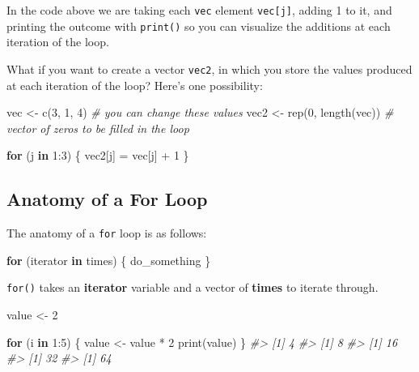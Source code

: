 \documentclass[
]{book}
\newenvironment{Shaded}{\begin{snugshade}}{\end{snugshade}}
\newcommand{\CommentTok}[1]{\textcolor[rgb]{0.56,0.35,0.01}{\textit{#1}}}
\newcommand{\ControlFlowTok}[1]{\textcolor[rgb]{0.13,0.29,0.53}{\textbf{#1}}}
\newcommand{\DecValTok}[1]{\textcolor[rgb]{0.00,0.00,0.81}{#1}}
\newcommand{\FunctionTok}[1]{\textcolor[rgb]{0.00,0.00,0.00}{#1}}
\newcommand{\NormalTok}[1]{#1}
\newcommand{\OtherTok}[1]{\textcolor[rgb]{0.56,0.35,0.01}{#1}}
\newcommand{\SpecialCharTok}[1]{\textcolor[rgb]{0.00,0.00,0.00}{#1}}
\begin{document}
In the code above we are taking each \texttt{vec} element \texttt{vec{[}j{]}}, adding 1 to it,
and printing the outcome with \texttt{print()} so you can visualize the additions
at each iteration of the loop.

What if you want to create a vector \texttt{vec2}, in which you store the values
produced at each iteration of the loop? Here's one possibility:

\begin{Shaded}
\begin{Highlighting}[]
\NormalTok{vec }\OtherTok{\textless{}{-}} \FunctionTok{c}\NormalTok{(}\DecValTok{3}\NormalTok{, }\DecValTok{1}\NormalTok{, }\DecValTok{4}\NormalTok{)  }\CommentTok{\# you can change these values}
\NormalTok{vec2 }\OtherTok{\textless{}{-}} \FunctionTok{rep}\NormalTok{(}\DecValTok{0}\NormalTok{, }\FunctionTok{length}\NormalTok{(vec))  }\CommentTok{\# vector of zeros to be filled in the loop}

\ControlFlowTok{for}\NormalTok{ (j }\ControlFlowTok{in} \DecValTok{1}\SpecialCharTok{:}\DecValTok{3}\NormalTok{) \{}
\NormalTok{  vec2[j] }\OtherTok{=}\NormalTok{ vec[j] }\SpecialCharTok{+} \DecValTok{1}
\NormalTok{\}}
\end{Highlighting}
\end{Shaded}

\hypertarget{anatomy-of-a-for-loop}{%
\subsection{Anatomy of a For Loop}\label{anatomy-of-a-for-loop}}

The anatomy of a \texttt{for} loop is as follows:

\begin{Shaded}
\begin{Highlighting}[]
\ControlFlowTok{for}\NormalTok{ (iterator }\ControlFlowTok{in}\NormalTok{ times) \{ }
\NormalTok{  do\_something}
\NormalTok{\}}
\end{Highlighting}
\end{Shaded}

\texttt{for()} takes an \textbf{iterator} variable and a vector of \textbf{times} to iterate
through.

\begin{Shaded}
\begin{Highlighting}[]
\NormalTok{value }\OtherTok{\textless{}{-}} \DecValTok{2}

\ControlFlowTok{for}\NormalTok{ (i }\ControlFlowTok{in} \DecValTok{1}\SpecialCharTok{:}\DecValTok{5}\NormalTok{) \{ }
\NormalTok{  value }\OtherTok{\textless{}{-}}\NormalTok{ value }\SpecialCharTok{*} \DecValTok{2} 
  \FunctionTok{print}\NormalTok{(value)}
\NormalTok{\}}
\CommentTok{\#\textgreater{} [1] 4}
\CommentTok{\#\textgreater{} [1] 8}
\CommentTok{\#\textgreater{} [1] 16}
\CommentTok{\#\textgreater{} [1] 32}
\CommentTok{\#\textgreater{} [1] 64}
\end{Highlighting}
\end{Shaded}
\end{document}
